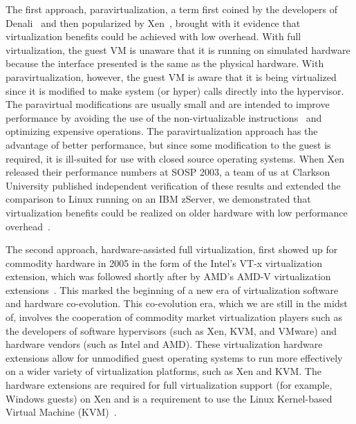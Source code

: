 The first approach, paravirtualization, a term first coined by the developers of Denali~\cite{whitaker_2002} and then popularized by Xen~\cite{barham_2003}, brought with it evidence that virtualization benefits could be achieved with low overhead. With full virtualization, the guest VM is unaware that it is running on simulated hardware because the interface presented is the same as the physical hardware. With paravirtualization, however, the guest VM is aware that it is being virtualized since it is modified to make system (or hyper) calls directly into the hypervisor. The paravirtual modifications are usually small and are intended to improve performance by avoiding the use of the non-virtualizable instructions~\cite{popek_1974} and optimizing expensive operations. The paravirtualization approach has the advantage of better performance, but since some modification to the guest is required, it is ill-suited for use with closed source operating systems. When Xen released their performance numbers at SOSP 2003, a team of us at Clarkson University published independent verification of these results and extended the comparison to Linux running on an IBM zServer, we demonstrated that virtualization benefits could be realized on older hardware with low performance overhead~\cite{clark_2004}.
 
The second approach, hardware-assisted full virtualization, first showed up for commodity hardware in 2005 in the form of the Intel's VT-x virtualization extension, which was followed shortly after by AMD's AMD-V virtualization extensions~\cite{van_Doorn_2006}. This marked the beginning of a new era of virtualization software and hardware co-evolution. This co-evolution era, which we are still in the midst of, involves the cooperation of commodity market virtualization players such as the developers of software hypervisors (such as Xen, KVM, and VMware) and hardware vendors (such as Intel and AMD). These virtualization hardware extensions allow for unmodified guest operating systems to run more effectively on a wider variety of virtualization platforms, such as Xen and KVM. The hardware extensions are required for full virtualization support (for example, Windows guests) on Xen and is a requirement to use the Linux Kernel-based Virtual Machine (KVM)~\cite{kvm_ols07}.

